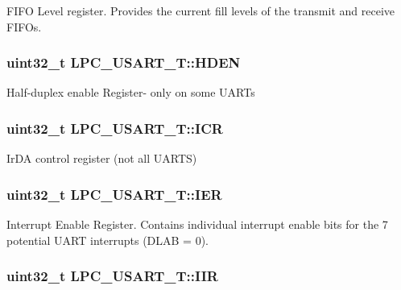 F\-I\-F\-O Level register. Provides the current fill levels of the transmit and receive F\-I\-F\-Os. \hypertarget{structLPC__USART__T_aedc3d854bf59c2f0999a8ae22e3e7bb4}{
\subsubsection[{H\-D\-E\-N}]{ uint32\-\_\-t L\-P\-C\-\_\-\-U\-S\-A\-R\-T\-\_\-\-T\-::\-H\-D\-E\-N}}\label{structLPC__USART__T_aedc3d854bf59c2f0999a8ae22e3e7bb4}
Half-\/duplex enable Register-\/ only on some U\-A\-R\-Ts \hypertarget{structLPC__USART__T_a85c78774fcee5d86f82a4bd497db2b00}{
\subsubsection[{I\-C\-R}]{ uint32\-\_\-t L\-P\-C\-\_\-\-U\-S\-A\-R\-T\-\_\-\-T\-::\-I\-C\-R}}\label{structLPC__USART__T_a85c78774fcee5d86f82a4bd497db2b00}
Ir\-D\-A control register (not all U\-A\-R\-T\-S) \hypertarget{structLPC__USART__T_a832413236bebfb6e6495c1055b9a85ae}{
\subsubsection[{I\-E\-R}]{ uint32\-\_\-t L\-P\-C\-\_\-\-U\-S\-A\-R\-T\-\_\-\-T\-::\-I\-E\-R}}\label{structLPC__USART__T_a832413236bebfb6e6495c1055b9a85ae}
Interrupt Enable Register. Contains individual interrupt enable bits for the 7 potential U\-A\-R\-T interrupts (D\-L\-A\-B = 0). \hypertarget{structLPC__USART__T_a470cdb18abc446a9768f404314c4a556}{
\subsubsection[{I\-I\-R}]{ uint32\-\_\-t L\-P\-C\-\_\-\-U\-S\-A\-R\-T\-\_\-\-T\-::\-I\-I\-R}}\label{structLPC__USART__T_a470cdb18abc446a9768f404314c4a556}
